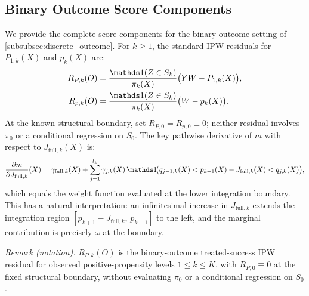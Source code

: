 \subsection{Binary Outcome Score Components}\label{app:scores_discrete}

We provide the complete score components for the binary outcome setting of \cref{subsubsec:discrete_outcome}. For $k\geqslant1$, the standard IPW residuals for $P_{1,k}(X)$ and $p_k(X)$ are:
\begin{align*}
    R_{P,k}(O) &= \frac{\indicator(Z \in S_k)}{\pi_k(X)} \big(YW - P_{1,k}(X)\big), \\
    R_{p,k}(O) &= \frac{\indicator(Z \in S_k)}{\pi_k(X)} \big(W - p_k(X)\big).
\end{align*}
At the known structural boundary, set $R_{P,0}=R_{p,0}\equiv0$; neither residual involves $\pi_0$ or a conditional regression on $S_0$.
The key pathwise derivative of $m$ with respect to $J_{\text{full},k}(X)$ is:
\begin{equation*}
    \frac{\partial m}{\partial J_{\text{full},k}}(X) = \gamma_{\text{full},k}(X) + \sum_{j=1}^{l_k} \gamma_{j,k}(X)\, \indicator\!\big(q_{j-1,k}(X) < p_{k+1}(X) - J_{\text{full},k}(X) < q_{j,k}(X)\big),
\end{equation*}
which equals the weight function evaluated at the lower integration boundary. This has a natural interpretation: an infinitesimal increase in $J_{\text{full},k}$ extends the integration region $[p_{k+1} - J_{\text{full},k},\, p_{k+1}]$ to the left, and the marginal contribution is precisely $\omega$ at the boundary.

\noindent\textit{Remark (notation).} $R_{P,k}(O)$ is the binary-outcome treated-success IPW residual for observed positive-propensity levels $1\leqslant k\leqslant K$, with $R_{P,0}\equiv0$ at the fixed structural boundary, without evaluating $\pi_0$ or a conditional regression on $S_0$.


